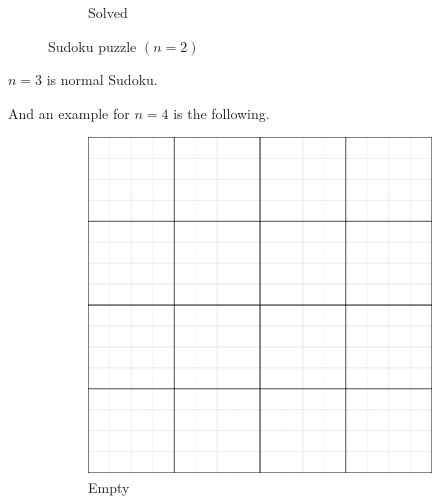 \begin{figure}[H]
\begin{subfigure}{.25\linewidth}
    \caption{Solved}
  \end{subfigure}
  \begin{subfigure}{.25\linewidth}
  \end{subfigure}
  \caption{Sudoku puzzle $(n=2)$}
\end{figure}

$n=3$ is normal Sudoku.

And an example for $n=4$ is the following.

\begin{figure}[H]
  \centering
  \begin{subfigure}{.49\linewidth}
    \centering
    \includegraphics[width=\linewidth]{content/assets/03_grovers_algorithm/sudoku_4_empty.png}
    \caption{Empty}
  \end{subfigure}
  \begin{subfigure}{.49\linewidth}
    \centering

\end{subfigure}
\end{figure}
